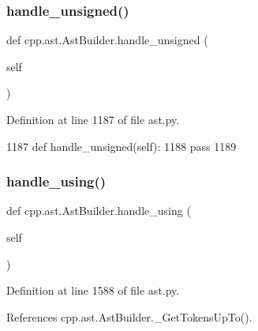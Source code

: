 \subsubsection{\texorpdfstring{handle\+\_\+unsigned()}{handle\_unsigned()}}
{\footnotesize\ttfamily def cpp.\+ast.\+Ast\+Builder.\+handle\+\_\+unsigned (\begin{DoxyParamCaption}\item[{}]{self }\end{DoxyParamCaption})}



Definition at line 1187 of file ast.\+py.


\begin{DoxyCode}
1187     \textcolor{keyword}{def }handle\_unsigned(self):
1188         \textcolor{keywordflow}{pass}
1189 
\end{DoxyCode}
\mbox{\label{classcpp_1_1ast_1_1AstBuilder_a785563f31bc3ed9559d9ce2854a83f1b}} 
\subsubsection{\texorpdfstring{handle\+\_\+using()}{handle\_using()}}
{\footnotesize\ttfamily def cpp.\+ast.\+Ast\+Builder.\+handle\+\_\+using (\begin{DoxyParamCaption}\item[{}]{self }\end{DoxyParamCaption})}



Definition at line 1588 of file ast.\+py.



References cpp.\+ast.\+Ast\+Builder.\+\_\+\+Get\+Tokens\+Up\+To().


